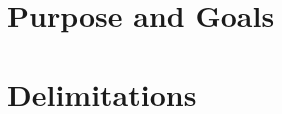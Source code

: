 \iffalse
\begin{itemize}
	\item Identifier names are important
	\item We have two identifier styles
	\item Some history 
	\item Two other studies
	\item Some background on them
	\item Reference all terms introduced
\end{itemize}
\fi





\section{Purpose and Goals}
\iffalse
\begin{itemize}
	\item Write about the grand scheme of things
	\item Set the correct expectations
	\item What can I expect to learn if I keep on reading?
	\item What are the success criteria for this work?
	\item How will the work be evaluated?
\end{itemize}
\fi


\section{Delimitations}
\iffalse
\begin{itemize}
	\item Scale down expectations and clarify
\end{itemize}
\fi